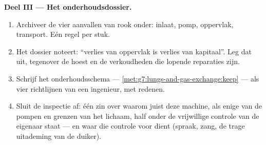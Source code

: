\begin{problem}
\medskip\noindent\textbf{Deel III --- Het
onderhoudsdossier.}
\begin{enumerate}[resume]
  \item Archiveer de vier aanvallen van rook onder: inlaat, pomp,
        oppervlak, transport. Eén regel per stuk.
  \item Het dossier noteert: ``verlies van oppervlak is verlies van
        kapitaal''. Leg dat uit, tegenover de hoest en de verkoudheden die
        lopende reparaties zijn.
  \item Schrijf het onderhoudsschema ---
        \cref{met:g7:lungs-and-gas-exchange:keep} --- als vier
        richtlijnen van een ingenieur, met redenen.
  \item Sluit de inspectie af: één zin over waarom juist deze machine, als
        enige van de pompen en grenzen van het lichaam, half onder de
        vrijwillige controle van de eigenaar staat --- en waar die
        controle voor dient (spraak, zang, de trage uitademing van de
        duiker).
\end{enumerate}
\end{problem}
